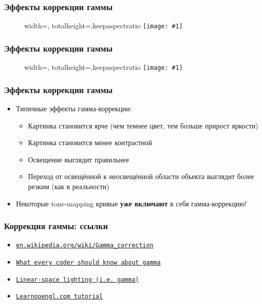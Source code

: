 \documentclass[10pt]{beamer}
\newcommand{\slideimage}[1]{
  \begin{figure}
    \begin{adjustbox}{width=\textwidth, totalheight=\textheight-2\baselineskip-2\baselineskip,keepaspectratio}
      \texttt{[image: \#1]}
    \end{adjustbox}
  \end{figure}
}
\begin{document}
\begin{frame}[fragile]
\frametitle{Эффекты коррекции гаммы}
\slideimage{gamma-ex2.png}
\end{frame}

\begin{frame}[fragile]
\frametitle{Эффекты коррекции гаммы}
\slideimage{gamma-ex3.png}
\end{frame}

\begin{frame}[fragile]
\frametitle{Эффекты коррекции гаммы}
\begin{itemize}
\item Типичные эффекты гамма-коррекции:
\pause
\begin{itemize}
\item Картинка становится ярче (чем темнее цвет, тем больше прирост яркости)
\pause
\item Картинка становится менее контрастной
\pause
\item Освещение выглядит правильнее
\pause
\item Переход от освещённой к неосвещённой области объекта выглядит более резким (как в реальности)
\end{itemize}
\pause
\item Некоторые tone-mapping кривые \textbf{уже включают} в себя гамма-коррекцию!
\end{itemize}
\end{frame}

\begin{frame}[fragile]
\frametitle{Коррекция гаммы: ссылки}
\begin{itemize}
\item \href{https://en.wikipedia.org/wiki/Gamma_correction}{\texttt{en.wikipedia.org/wiki/Gamma\_correction}}
\item \href{http://blog.johnnovak.net/2016/09/21/what-every-coder-should-know-about-gamma}{\texttt{What every coder should know about gamma}}
\item \href{http://filmicworlds.com/blog/linear-space-lighting-i-e-gamma}{\texttt{Linear-space lighting (i.e. gamma)}}
\item \href{https://learnopengl.com/Advanced-Lighting/Gamma-Correction}{\texttt{Learnopengl.com tutorial}}
\end{itemize}
\end{frame}
\end{document}
